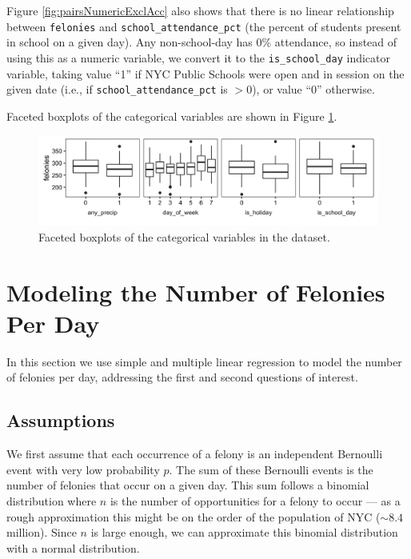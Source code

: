 \documentclass[11pt,notitlepage]{article}
\begin{document}
Figure \ref{fig:pairsNumericExclAcc} also shows that there is no linear relationship between \texttt{felonies} and \texttt{school_attendance_pct} (the percent of students present in school on a given day). Any non-school-day has 0\% attendance, so instead of using this as a numeric variable, we convert it to the \texttt{is_school_day} indicator variable, taking value ``1'' if NYC Public Schools were open and in session on the given date (i.e., if \texttt{school_attendance_pct} is $>0$), or value ``0'' otherwise.

Faceted boxplots of the categorical variables are shown in Figure \ref{fig:facetCategorical}.

\begin{figure}[!h]
	\centering
	\captionsetup{width=0.9\textwidth}
	\includegraphics[width=6in]{figures/facetCategorical.png}
	\caption{Faceted boxplots of the categorical variables in the dataset.}
	\label{fig:facetCategorical}
\end{figure}

\section{Modeling the Number of Felonies Per Day}
\label{sec:modelingFelonies}

In this section we use simple and multiple linear regression to model the number of felonies per day, addressing the first and second questions of interest.

\subsection{Assumptions}
\label{sec:feloniesAssumptions}

We first assume that each occurrence of a felony is an independent Bernoulli event with very low probability $p$. The sum of these Bernoulli events is the number of felonies that occur on a given day. This sum follows a binomial distribution where $n$ is the number of opportunities for a felony to occur --- as a rough approximation this might be on the order of the population of NYC ($\sim 8.4$ million). Since $n$ is large enough, we can approximate this binomial distribution with a normal distribution.
\end{document}
